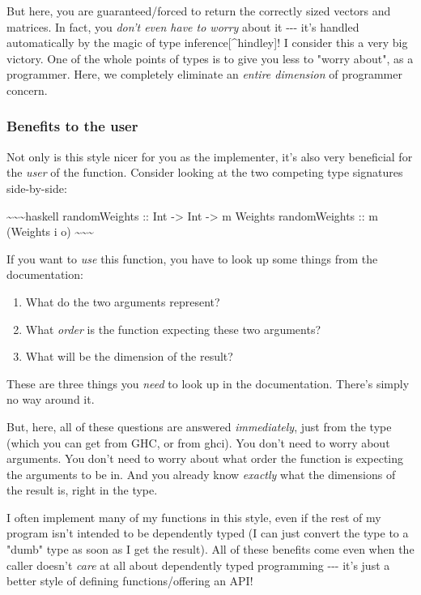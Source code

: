 \documentclass[]{article}
\begin{document}
But here, you are guaranteed/forced to return the correctly sized vectors and
matrices. In fact, you \emph{don't even have to worry} about it -\/-\/- it's
handled automatically by the magic of type inference{[}\^{}hindley{]}! I
consider this a very big victory. One of the whole points of types is to give
you less to "worry about", as a programmer. Here, we completely eliminate an
\emph{entire dimension} of programmer concern.

\subsubsection{Benefits to the user}

Not only is this style nicer for you as the implementer, it's also very
beneficial for the \emph{user} of the function. Consider looking at the two
competing type signatures side-by-side:

\textasciitilde{}\textasciitilde{}\textasciitilde{}haskell randomWeights :: Int
-\textgreater{} Int -\textgreater{} m Weights randomWeights :: m (Weights i o)
\textasciitilde{}\textasciitilde{}\textasciitilde{}

If you want to \emph{use} this function, you have to look up some things from
the documentation:

\begin{enumerate}
\tightlist
\item
  What do the two arguments represent?
\item
  What \emph{order} is the function expecting these two arguments?
\item
  What will be the dimension of the result?
\end{enumerate}

These are three things you \emph{need} to look up in the documentation. There's
simply no way around it.

But, here, all of these questions are answered \emph{immediately}, just from the
type (which you can get from GHC, or from ghci). You don't need to worry about
arguments. You don't need to worry about what order the function is expecting
the arguments to be in. And you already know \emph{exactly} what the dimensions
of the result is, right in the type.

I often implement many of my functions in this style, even if the rest of my
program isn't intended to be dependently typed (I can just convert the type to a
"dumb" type as soon as I get the result). All of these benefits come even when
the caller doesn't \emph{care} at all about dependently typed programming
-\/-\/- it's just a better style of defining functions/offering an API!
\end{document}
